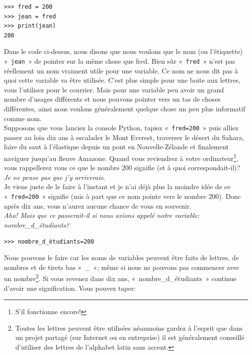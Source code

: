 \begin{Verbatim}[frame=single,rulecolor=\color{mbleu}, label=à taper]
>>> fred = 200
>>> jean = fred
>>> print(jean)
200
\end{Verbatim}

Dans le code ci-dessus, nous disons que nous voulons que le nom (ou l'étiquette) «~\texttt{jean}~» de pointer
sur la même chose que fred. Bien sûr «~\texttt{fred}~» n'est pas réellement un nom vraiment utile pour une variable.
Ce nom ne nous dit pas à quoi cette variable va être utilisée. C'est plus simple pour une boite aux lettres, vous l'utilisez pour le courrier. Mais pour une variable peu avoir un grand nombre d'usages différents et nous pouvons 
pointer vers un tas de choses différentes, ainsi nous voulons généralement quelque chose un peu plus informatif comme nom.\\

Supposons que vous lanciez la console Python, tapiez «~\texttt{fred=200}~» puis alliez passer au loin dix ans à escalader le Mont Everest, traverser le désert du Sahara, faire du saut à l'élastique depuis un pont en Nouvelle-Zélande et finalement naviguer jusqu'au fleuve Amazone. Quand vous reviendrez à votre ordinateur\footnote{S'il fonctionne encore!}, vous rappellerez vous ce que le nombre 200 signifie (et à quoi correspondait-il)?\\

\emph{Je ne pense pas que j'y arriverais.}\\

Je viens juste de le faire à l'instant et je n'ai déjà plus la moindre idée de ce «~\texttt{fred=200}~» signifie (mis à part que ce nom pointe vers le nombre 200). Donc après dix ans, vous n'aurez aucune chance de vous en souvenir.\\


\emph{Aha! Mais que ce passerait-il si nous avions appelé notre variable: nombre\_d\_étudiants?}\\

\begin{Verbatim}[frame=single,rulecolor=\color{mbleu}, label=à taper]
>>> nombre_d_étudiants=200
\end{Verbatim}

Nous pouvons le faire car les noms de variables peuvent être faits de lettres, de nombres et de tirets bas «~\_~»; même si nous ne pouvons pas commencer avec un nombre\footnote{Toutes les lettres peuvent être utilisées néanmoins gardez à l'esprit que dans un projet partagé (sur Internet ou en entreprise) il est généralement conseillé d'utiliser des lettres de l'alphabet latin sans accent.}. Si vous revenez dans dix ans, «~nombre\_d\_étudiants~» continue d'avoir une signification. Vous pouvez taper:

